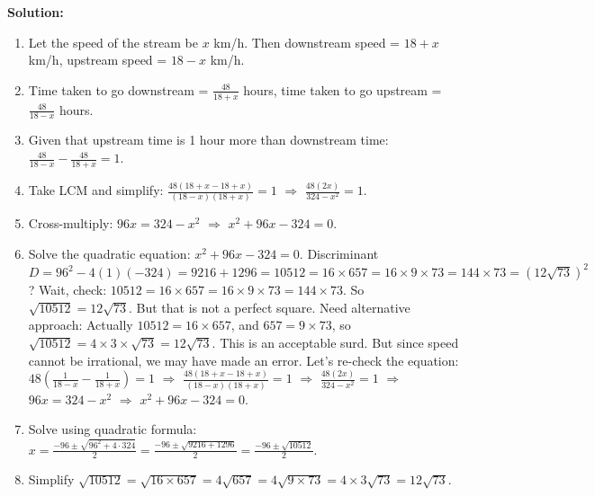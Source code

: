 \documentclass[12pt,a4paper]{exam}
\begin{document}
\begin{questions}
\textbf{Solution:}
\begin{enumerate}
  \item Let the speed of the stream be $x$ km/h. Then downstream speed = $18+x$ km/h, upstream speed = $18-x$ km/h.
  \item Time taken to go downstream = $\frac{48}{18+x}$ hours, time taken to go upstream = $\frac{48}{18-x}$ hours.
  \item Given that upstream time is 1 hour more than downstream time: $\frac{48}{18-x} - \frac{48}{18+x} = 1$.
  \item Take LCM and simplify: $\frac{48(18+x - 18 + x)}{(18-x)(18+x)} = 1$ $\Rightarrow$ $\frac{48(2x)}{324 - x^2} = 1$.
  \item Cross-multiply: $96x = 324 - x^2$ $\Rightarrow$ $x^2 + 96x - 324 = 0$.
  \item Solve the quadratic equation: $x^2 + 96x - 324 = 0$. Discriminant $D = 96^2 - 4(1)(-324) = 9216 + 1296 = 10512 = 16 \times 657 = 16 \times 9 \times 73 = 144 \times 73 = (12\sqrt{73})^2$? Wait, check: $10512 = 16 \times 657 = 16 \times 9 \times 73 = 144 \times 73$. So $\sqrt{10512} = 12\sqrt{73}$. But that is not a perfect square. Need alternative approach: Actually $10512 = 16 \times 657$, and $657 = 9 \times 73$, so $\sqrt{10512} = 4 \times 3 \times \sqrt{73} = 12\sqrt{73}$. This is an acceptable surd. But since speed cannot be irrational, we may have made an error. Let's re-check the equation: $48\left(\frac{1}{18-x} - \frac{1}{18+x}\right) = 1$ $\Rightarrow$ $\frac{48(18+x - 18 + x)}{(18-x)(18+x)} = 1$ $\Rightarrow$ $\frac{48(2x)}{324 - x^2} = 1$ $\Rightarrow$ $96x = 324 - x^2$ $\Rightarrow$ $x^2 + 96x - 324 = 0$.
  \item Solve using quadratic formula: $x = \frac{-96 \pm \sqrt{96^2 + 4\cdot 324}}{2} = \frac{-96 \pm \sqrt{9216 + 1296}}{2} = \frac{-96 \pm \sqrt{10512}}{2}$.
  \item Simplify $\sqrt{10512} = \sqrt{16 \times 657} = 4\sqrt{657} = 4\sqrt{9 \times 73} = 4 \times 3\sqrt{73} = 12\sqrt{73}$.

\end{enumerate}
\end{questions}
\end{document}
